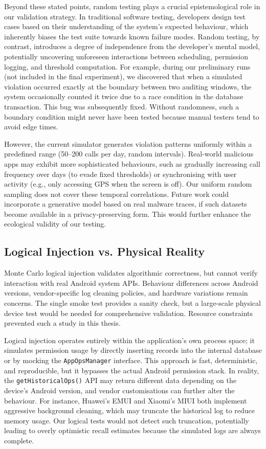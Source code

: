 Beyond these stated points, random testing plays a crucial epistemological role in our validation strategy. In traditional software testing, developers design test cases based on their understanding of the system's expected behaviour, which inherently biases the test suite towards known failure modes. Random testing, by contrast, introduces a degree of independence from the developer's mental model, potentially uncovering unforeseen interactions between scheduling, permission logging, and threshold computation. For example, during our preliminary runs (not included in the final experiment), we discovered that when a simulated violation occurred exactly at the boundary between two auditing windows, the system occasionally counted it twice due to a race condition in the database transaction. This bug was subsequently fixed. Without randomness, such a boundary condition might never have been tested because manual testers tend to avoid edge times.

However, the current simulator generates violation patterns uniformly within a predefined range (50–200 calls per day, random intervals). Real‑world malicious apps may exhibit more sophisticated behaviours, such as gradually increasing call frequency over days (to evade fixed thresholds) or synchronising with user activity (e.g., only accessing GPS when the screen is off). Our uniform random sampling does not cover these temporal correlations. Future work could incorporate a generative model based on real malware traces, if such datasets become available in a privacy‑preserving form. This would further enhance the ecological validity of our testing.

\subsection{Logical Injection vs. Physical Reality}

Monte Carlo logical injection validates algorithmic correctness, but cannot verify interaction with real Android system APIs. Behaviour differences across Android versions, vendor-specific log cleaning policies, and hardware variations remain concerns. The single smoke test provides a sanity check, but a large-scale physical device test would be needed for comprehensive validation. Resource constraints prevented such a study in this thesis.

Logical injection operates entirely within the application's own process space; it simulates permission usage by directly inserting records into the internal database or by mocking the \texttt{AppOpsManager} interface. This approach is fast, deterministic, and reproducible, but it bypasses the actual Android permission stack. In reality, the \texttt{getHistoricalOps()} API may return different data depending on the device's Android version, and vendor customisations can further alter the behaviour. For instance, Huawei's EMUI and Xiaomi's MIUI both implement aggressive background cleaning, which may truncate the historical log to reduce memory usage. Our logical tests would not detect such truncation, potentially leading to overly optimistic recall estimates because the simulated logs are always complete.

